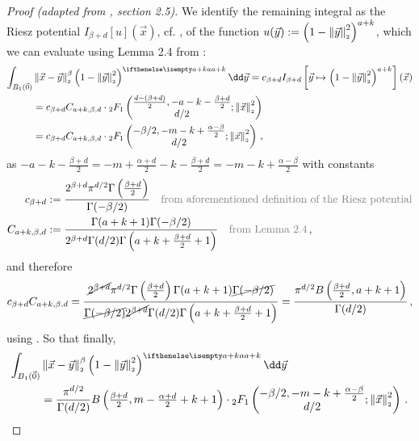 \begin{proof}[Proof (adapted from \cite{2021-arbitrary-dimensions}, section 2.5)]
  We identify the remaining integral as the Riesz potential $I_{\beta+d}[u](\vec{x})$, cf. , of the function $u(\vec{y}) := \left(1-\left\lVert\vec{y}\right\rVert_{\scriptscriptstyle 2}^2\right)^{a+k}$, which we can evaluate using Lemma 2.4 from \cite{2011-porous-medium-1}:
  \begin{align*}
    \int_{B_1(\vec{0})} & \norm{\vec{x}-\vec{y}}^\beta \weight[a+k]{y} \dd\vec{y} = c_{\beta+d} I_{\beta+d}\left[\vec{y} \mapsto \left(1-\norm{\vec{y}}^2\right)^{a+k}\right](\vec{x}) \\
                        & = c_{\beta+d} C_{a+k, \beta, d} \cdot {}_2F_1\left(\begin{matrix}\frac{d-(\beta+d)}{2}, -a-k-\frac{\beta+d}{2} \\d/2\end{matrix}; \norm{\vec{x}}^2\right)    \\
                        & = c_{\beta+d} C_{a+k, \beta, d} \cdot {}_2F_1\left(\begin{matrix}-\beta/2, -m-k+\frac{\alpha-\beta}{2} \\d/2\end{matrix}; \norm{\vec{x}}^2\right)\,,
  \end{align*}
  as $-a-k-\frac{\beta+d}{2} = -m + \frac{\alpha+d}{2} -k - \frac{\beta+d}{2} = -m-k+\frac{\alpha-\beta}{2}$ with constants
  \begin{align*}
    c_{\beta+d}       & := \frac{2^{\beta+d} \pi^{d/2} \Gamma\left(\frac{\beta+d}{2}\right)}{\Gamma(-\beta/2)}                      \quad \text{\textcolor{gray}{from aforementioned definition of the Riesz potential}} \\
    C_{a+k, \beta, d} & := \frac{\Gamma(a+k+1) \Gamma(-\beta/2)}{2^{\beta+d}\Gamma(d/2) \Gamma\left(a+k+\frac{\beta+d}{2}+1\right)} \quad \text{\textcolor{gray}{from Lemma 2.4}}\,,
  \end{align*}
  and therefore
  $$c_{\beta+d} C_{a+k, \beta, d} = \frac{\cancel{2^{\beta+d}} \pi^{d/2} \Gamma\left(\frac{\beta+d}{2}\right) \Gamma(a+k+1) \cancel{\Gamma(-\beta/2)}}{\cancel{\Gamma(-\beta/2)} \cancel{2^{\beta+d}}\Gamma(d/2) \Gamma\left(a+k+\frac{\beta+d}{2}+1\right)} = \frac{\pi^{d/2}B\left(\tfrac{\beta+d}{2}, a+k+1\right)}{\Gamma(d/2)}\,,$$
  using .
  So that finally,
  \begin{align*}
    \int_{B_1(\vec{0})} & \norm{\vec{x}-\vec{y}}^\beta \weight[a+k]{y} \dd\vec{y}                                                                                                                                                         \\
                        & =\frac{\pi^{d/2}}{\Gamma(d/2)} B\left(\tfrac{\beta+d}{2}, m-\tfrac{\alpha+d}{2}+k+1\right) \cdot {}_2F_1\left(\begin{matrix}-\beta/2, -m-k+\frac{\alpha-\beta}{2} \\d/2\end{matrix}; \norm{\vec{x}}^2\right)\,.
  \end{align*}


\end{proof}
